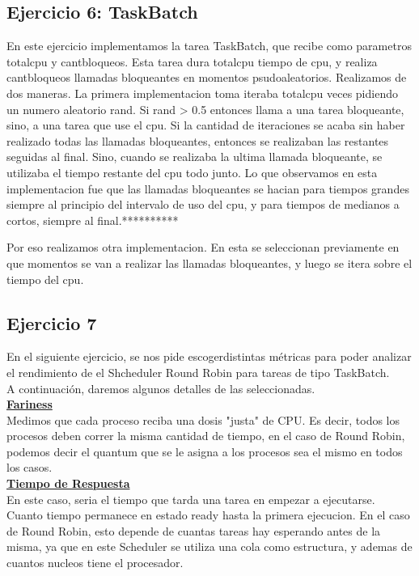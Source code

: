 \subsection{Ejercicio 6: TaskBatch}

En este ejercicio implementamos la tarea TaskBatch, que recibe como parametros totalcpu y cantbloqueos. Esta tarea dura totalcpu tiempo de 
cpu, y realiza cantbloqueos llamadas bloqueantes en momentos psudoaleatorios. Realizamos de dos maneras. La primera implementacion toma iteraba totalcpu
veces pidiendo un numero aleatorio rand. Si rand > 0.5 entonces llama a una tarea bloqueante, sino, a una tarea que use el cpu. Si la cantidad 
de iteraciones se acaba sin haber realizado todas las llamadas bloqueantes, entonces se realizaban las restantes seguidas al final. Sino, cuando se realizaba
la ultima llamada bloqueante, se utilizaba el tiempo restante del cpu todo junto. Lo que observamos en esta implementacion fue que las llamadas bloqueantes
se hacian para tiempos grandes siempre al principio del intervalo de uso del cpu, y para tiempos de medianos a cortos, siempre al final.**********

Por eso realizamos otra implementacion. En esta se seleccionan previamente en que momentos se van a realizar las llamadas bloqueantes, y luego se itera 
sobre el tiempo del cpu.


\subsection{Ejercicio 7}
En el siguiente ejercicio, se nos pide escogerdistintas m\'etricas para poder analizar el rendimiento de el Shcheduler Round Robin para tareas de tipo TaskBatch.\\
A continuaci\'on, daremos algunos detalles de las seleccionadas.\\

\textbf{\underline{Fariness}}\\
Medimos que cada proceso reciba una dosis "justa" de CPU. Es decir, todos los procesos deben correr la misma cantidad de tiempo, en el caso de Round Robin, podemos decir el quantum que se le asigna a los procesos sea el mismo en todos los casos.\\

\textbf{\underline{Tiempo de Respuesta}}\\
En este caso, seria el tiempo que tarda una tarea en empezar a ejecutarse.
Cuanto tiempo permanece en estado ready hasta la primera ejecucion.
En el caso de Round Robin, esto depende de cuantas tareas hay esperando antes de la misma, ya que en este Scheduler se utiliza una cola como estructura, y ademas de cuantos nucleos tiene el procesador.\\

